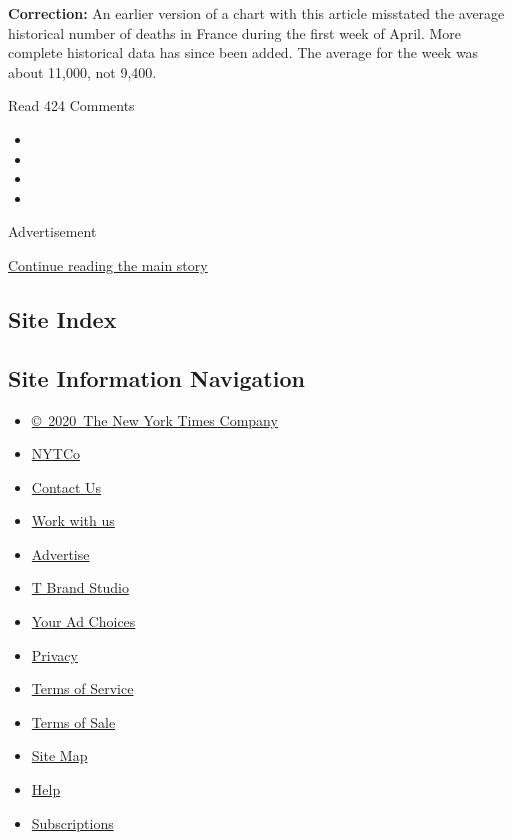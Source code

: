 \textbf{Correction:} An earlier version of a chart with this article
misstated the average historical number of deaths in France during the
first week of April. More complete historical data has since been added.
The average for the week was about 11,000, not 9,400.

Read 424 Comments

\begin{itemize}
\item
\item
\item
\item
\end{itemize}

Advertisement

\protect\hyperlink{after-bottom}{Continue reading the main story}

\hypertarget{site-index}{%
\subsection{Site Index}\label{site-index}}

\hypertarget{site-information-navigation}{%
\subsection{Site Information
Navigation}\label{site-information-navigation}}

\begin{itemize}
\tightlist
\item
  \href{https://help.nytimes3xbfgragh.onion/hc/en-us/articles/115014792127-Copyright-notice}{©~2020~The
  New York Times Company}
\end{itemize}

\begin{itemize}
\tightlist
\item
  \href{https://www.nytco.com/}{NYTCo}
\item
  \href{https://help.nytimes3xbfgragh.onion/hc/en-us/articles/115015385887-Contact-Us}{Contact
  Us}
\item
  \href{https://www.nytco.com/careers/}{Work with us}
\item
  \href{https://nytmediakit.com/}{Advertise}
\item
  \href{http://www.tbrandstudio.com/}{T Brand Studio}
\item
  \href{https://www.nytimes3xbfgragh.onion/privacy/cookie-policy\#how-do-i-manage-trackers}{Your
  Ad Choices}
\item
  \href{https://www.nytimes3xbfgragh.onion/privacy}{Privacy}
\item
  \href{https://help.nytimes3xbfgragh.onion/hc/en-us/articles/115014893428-Terms-of-service}{Terms
  of Service}
\item
  \href{https://help.nytimes3xbfgragh.onion/hc/en-us/articles/115014893968-Terms-of-sale}{Terms
  of Sale}
\item
  \href{https://spiderbites.nytimes3xbfgragh.onion}{Site Map}
\item
  \href{https://help.nytimes3xbfgragh.onion/hc/en-us}{Help}
\item
  \href{https://www.nytimes3xbfgragh.onion/subscription?campaignId=37WXW}{Subscriptions}
\end{itemize}
